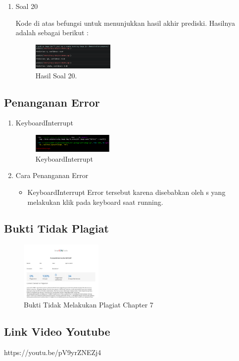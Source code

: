 \begin{enumerate}
	\item Soal 20
	\hfill\break
	
	Kode di atas befungsi untuk menunjukkan hasil akhir prediski. Hasilnya adalah sebagai berikut :  
	\begin{figure}[H]
	\centering
		\includegraphics[width=4cm]{figures/1174080/7/materi/hasil20.PNG}
		\caption{Hasil Soal 20.}
	\end{figure}
\end{enumerate}

\subsection{Penanganan Error}
\begin{enumerate}
	\item KeyboardInterrupt
	\begin{figure}[H]
		\includegraphics[width=4cm]{figures/1174080/7/error/1.PNG}
		\centering
		\caption{KeyboardInterrupt}
	\end{figure}

	\item Cara Penanganan Error
	\begin{itemize}
		\item KeyboardInterrupt
		\hfill\break
		Error tersebut karena disebabkan oleh s yang melakukan klik pada keyboard saat running.
	\end{itemize}
\end{enumerate}

\subsection{Bukti Tidak Plagiat}
\begin{figure}[H]
\centering
	\includegraphics[width=4cm]{figures/1174080/7/buktiplagiat/1.PNG}
	\caption{Bukti Tidak Melakukan Plagiat Chapter 7}
\end{figure}

\subsection{Link Video Youtube}
https://youtu.be/pV9yrZNEZj4